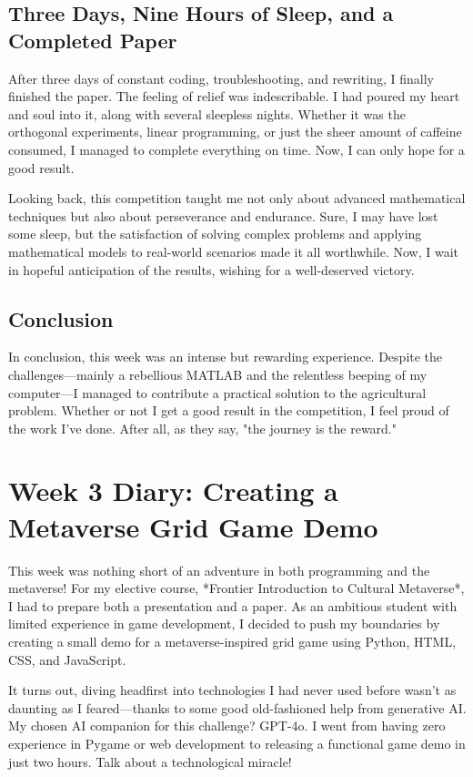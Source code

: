 \documentclass[a4paper]{article} 	%
\begin{document}
\subsection*{Three Days, Nine Hours of Sleep, and a Completed Paper}

After three days of constant coding, troubleshooting, and rewriting, I finally finished the paper. The feeling of relief was indescribable. I had poured my heart and soul into it, along with several sleepless nights. Whether it was the orthogonal experiments, linear programming, or just the sheer amount of caffeine consumed, I managed to complete everything on time. Now, I can only hope for a good result. 

Looking back, this competition taught me not only about advanced mathematical techniques but also about perseverance and endurance. Sure, I may have lost some sleep, but the satisfaction of solving complex problems and applying mathematical models to real-world scenarios made it all worthwhile. Now, I wait in hopeful anticipation of the results, wishing for a well-deserved victory. 

\subsection*{Conclusion}

In conclusion, this week was an intense but rewarding experience. Despite the challenges—mainly a rebellious MATLAB and the relentless beeping of my computer—I managed to contribute a practical solution to the agricultural problem. Whether or not I get a good result in the competition, I feel proud of the work I’ve done. After all, as they say, "the journey is the reward."

\section{Week 3 Diary: Creating a Metaverse Grid Game Demo}

This week was nothing short of an adventure in both programming and the metaverse! For my elective course, *Frontier Introduction to Cultural Metaverse*, I had to prepare both a presentation and a paper. As an ambitious student with limited experience in game development, I decided to push my boundaries by creating a small demo for a metaverse-inspired grid game using Python, HTML, CSS, and JavaScript.

It turns out, diving headfirst into technologies I had never used before wasn’t as daunting as I feared—thanks to some good old-fashioned help from generative AI. My chosen AI companion for this challenge? GPT-4o. I went from having zero experience in Pygame or web development to releasing a functional game demo in just two hours. Talk about a technological miracle!
\end{document}
